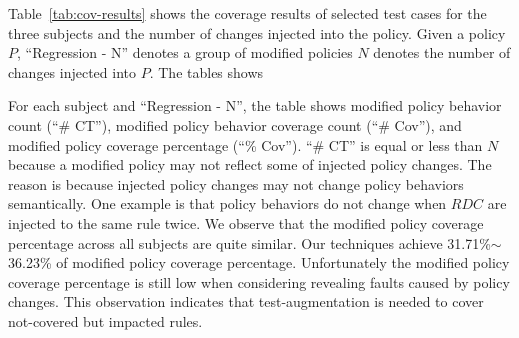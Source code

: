 Table~\ref{tab:cov-results} shows the coverage results of selected test cases for the three subjects and
the number of changes injected into the policy.
Given a policy $P$,
``Regression - N'' denotes a group of modified policies $N$ denotes the number of changes injected into $P$.
The tables shows

For each subject and ``Regression - N'',
the table shows modified policy behavior count (``\# CT''),  modified policy behavior coverage count (``\# Cov''), and modified policy coverage percentage (``\% Cov'').
``\# CT'' is equal or less than $N$ because a modified policy may not
reflect some of injected policy changes. The reason is because injected policy
changes may not change policy behaviors semantically.
One example is that policy behaviors do not change
when $RDC$ are injected to the same rule twice.
We observe that
the modified policy coverage percentage across all subjects 
are quite similar. Our techniques achieve 31.71\%$\sim$36.23\% of modified policy coverage percentage.
Unfortunately the
modified policy coverage percentage is still low when considering revealing
faults caused by policy changes.
This observation indicates that test-augmentation
is needed to cover not-covered but impacted rules. 

%

%




